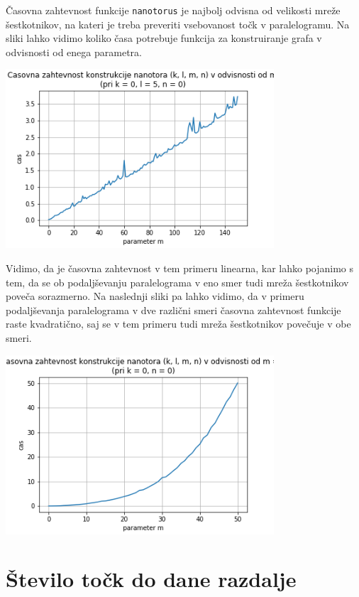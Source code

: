\documentclass[a4paper, 10 pt, titlepage]{article}
\begin{document}
Časovna zahtevnost funkcije \texttt{nanotorus} je najbolj odvisna od velikosti mreže šestkotnikov, na kateri je treba preveriti vsebovanost točk v paralelogramu. Na sliki lahko vidimo koliko časa potrebuje funkcija za konstruiranje grafa v odvisnosti od enega parametra.
\begin{center}
\includegraphics[width=10cm]{zahtevnost1}
\end{center}
\vspace{1cm}

Vidimo, da je časovna zahtevnost v tem primeru linearna, kar lahko pojanimo s tem, da se ob podaljševanju paralelograma v eno smer tudi mreža šestkotnikov poveča sorazmerno. Na naslednji sliki pa lahko vidimo, da v primeru podaljševanja paralelograma v dve različni smeri časovna zahtevnost funkcije raste kvadratično, saj se v tem primeru tudi mreža šestkotnikov povečuje v obe smeri.

\begin{center}
\includegraphics[width=10cm]{zahtevnost2}
\end{center}
\vspace{1cm}

\pagebreak

\section{Število točk do dane razdalje}
\end{document}

